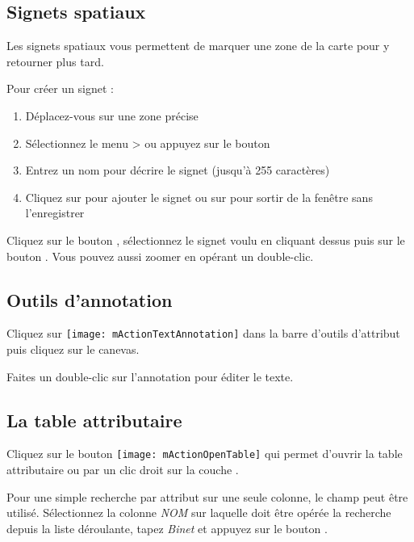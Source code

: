\subsection{Signets spatiaux} \label{sec:bookmarks}

Les signets spatiaux vous permettent de marquer une zone de la carte pour y retourner plus tard.

Pour créer un signet :
\begin{enumerate}
\item Déplacez-vous sur une zone précise
\item Sélectionnez le menu  >  ou appuyez sur le bouton 
\item Entrez un nom pour décrire le signet (jusqu'à 255 caractères)
\item Cliquez sur  pour ajouter le signet ou sur  pour sortir de la fenêtre sans l'enregistrer
\end{enumerate}

Cliquez sur le bouton , sélectionnez le signet voulu en cliquant dessus puis sur le bouton . Vous pouvez aussi zoomer en opérant un double-clic.

\subsection{Outils d'annotation}

Cliquez sur \texttt{[image: mActionTextAnnotation]} dans la barre d'outils d'attribut puis cliquez sur le canevas.

Faites un double-clic sur l'annotation pour éditer le texte.

\subsection{La table attributaire}

Cliquez sur le bouton \texttt{[image: mActionOpenTable]} qui permet d'ouvrir la table attributaire ou par un clic droit sur la couche . 

Pour une simple recherche par attribut sur une seule colonne, le champ  peut être utilisé. Sélectionnez la colonne \textit{NOM} sur laquelle doit être opérée la recherche depuis la liste déroulante, tapez \textit{Binet} et appuyez sur le bouton . 

